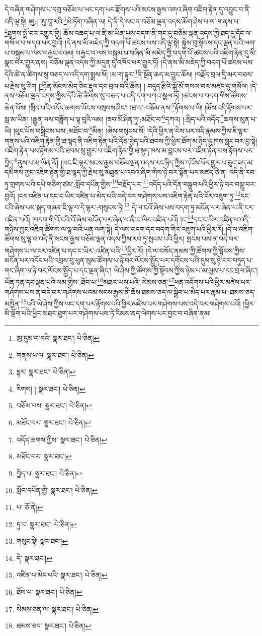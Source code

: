དེ་བཞིན་གཤེགས་པ་དགྲ་བཅོམ་པ་ཡང་དག་པར་རྫོགས་པའི་སངས་རྒྱས་འགའ་ཞིག་འཇིག་རྟེན་དུ་འབྱུང་བ་ནི་འདི་ལྟ་སྟེ། ཨུ:། ཨུ་བཱ་རའི་\footnote{ཨུ་དུམ་བ་རའི་  སྣར་ཐང་།  པེ་ཅིན། }མེ་ཏོག་བཞིན་ལ། དེ་ནི་དེ་སང་ན་བཅོམ་ལྡན་འདས་ཆོག་ཤེས་པ་ལ་:གནས་པ་\footnote{གནས་པ་ལ་  སྣར་ཐང་།  པེ་ཅིན། }ཐུགས་སྤྲོ་བར་འགྱུར་གྱི། ཆོས་འཆད་པ་ལ་ནི་མ་ཡིན་པས་བདག་ནི་གང་དུ་བཅོམ་ལྡན་འདས་ཀྱི་ཐད་དུ་དོང་ལ་གསོལ་བ་གདབ་པར་བྱའོ། །དེ་ནས་མི་མཇེད་ཀྱི་བདག་པོ་ཚངས་པས་འདི་ལྟ་སྟེ། སྐྱེས་བུ་སྟོབས་དང་ལྡན་པའི་ལག་པ་བསྐུམ་པ་ལས་བརྐྱང་བའམ། བརྐྱང་བ་ལས་བསྐུམ་པ་བཞིན་མི་མཇེད་ཀྱི་བདག་པོ་ཚངས་པའི་འཇིག་རྟེན་དུ་མི་སྣང་བར་གྱུར་ནས། བཅོམ་ལྡན་འདས་ཀྱི་མདུན་དུ་འཁོད་པར་གྱུར་ཏོ། །དེ་ནས་མི་མཇེད་ཀྱི་བདག་པོ་ཚངས་པས་དེའི་ཚེ་ན་ཚིགས་སུ་བཅད་པ་འདི་དག་སྨྲས་སོ། །མ་ག་དྷཱར་\footnote{དྷར་  སྣར་ཐང་།  པེ་ཅིན། }ནི་སྔོན་ཆད་མ་བྱུང་ཆོས། །བརྗོད་བྲལ་དྲི་མར་བཅས་པ་རྗེས་སུ་རིག །\footnote{རིགས། །  སྣར་ཐང་།  པེ་ཅིན། }ཉོན་མོངས་མེད་ཅིང་རྡུལ་དང་བྲལ་བའི་ཆོས། །
བདུད་རྩིའི་སྒོ་མོ་གསལ་བར་མཛད་དུ་གསོལ། །དེ་ནས་བཅོམ་ལྡན་འདས་ཀྱིས་དེའི་ཚེ་ཚིགས་སུ་བཅད་པ་འདི་དག་བཀའ་སྩལ་ཏོ། །ཚངས་པ་བདག་གིས་ཚོགས་ཆེན་པོས། །སྲིད་པའི་འདོད་ཆགས་ཡོངས་བསྲབས་ཤིང་། །ཐ་བ་:བཅོམ་ནས་\footnote{བཅོམ་པས་  སྣར་ཐང་།  པེ་ཅིན། }རྟོགས་པ་ཡི། །ཆོས་འདི་རྟོགས་པར་སླ་མ་ཡིན། །རྒྱུན་ལས་བཟློག་པ་ལྟ་བུའི་ལམ། །ཟབ་མོ་ཤིན་ཏུ་:མཐོང་བ་\footnote{མཐོང་བར་  སྣར་ཐང་།  པེ་ཅིན། }དཀའ། །:སྲིད་པའི་འདོད་\footnote{འདོད་ཆགས་ཀྱིས་  སྣར་ཐང་།  པེ་ཅིན། }ཆགས་མུན་པ་ཡི། །ཕུང་པོས་བསྒྲིབས་པས་:མཐོང་བ་\footnote{མཐོང་བར་  སྣར་ཐང་། }མིན། །ཞེས་གསུངས་སོ། །དེའི་ཕྱིར་ན་ངེས་པར་འདི་རྣམས་ཀྱིས་ཇི་ལྟར་གནས་པའི་འཇིག་རྟེན་གྱི་ཐ་སྙད་ནི་འཇིག་རྟེན་པའི་དོན་བྱེད་པའི་ཐབས་ཀྱི་ཕྱིར་ཐོག་མ་ཉིད་དུ་ཁས་བླང་བར་བྱ་སྟེ། འཇིག་རྟེན་པས་རྟོགས་པའི་ཐབས་སུ་གྱུར་པ་འཇིག་རྟེན་གྱི་ཐ་སྙད་ཁས་མ་བླངས་པར་འཇིག་རྟེན་པས་རྟོགས་པར་བྱེད་\footnote{བྱེད་པ་  སྣར་ཐང་།  པེ་ཅིན། }ནུས་པ་མ་ཡིན་ནོ། །ཡང་ཇི་ལྟར་སངས་རྒྱས་བཅོམ་ལྡན་འདས་རང་ཉིད་ཀྱིས་དངོས་པོར་གྱུར་པ་ཅུང་ཟད་མ་དམིགས་ཀྱང་འཇིག་རྟེན་གྱི་ཐ་སྙད་ཀྱི་རྗེས་སུ་མཐུན་པ་འབའ་ཞིག་གིས་ཉེ་བར་སྟོན་པར་མཛད་ཅེ་ན། འདི་ནི་རབ་ཏུ་གྲགས་པའི་དཔེ་གཅིག་ཙམ་:སློབ་དཔོན་གྱིས་\footnote{སློབ་དཔོན་གྱི་  སྣར་ཐང་།  པེ་ཅིན། }བརྗོད་པར་\footnote{པ་  ཅོ་ནེ། }འདོད་པའི་དོན་བསྒྲུབ་པའི་ཕྱིར་ཉེ་བར་བསྡུ་བར་བྱའོ། །ངར་འཛིན་པ་དང་ང་ཡིར་འཛིན་པ་མེད་པའི་བདེ་བར་གཤེགས་པས་འཇིག་རྟེན་པའི་ངོར་འཇུག་ཏུ་\footnote{ཏུ་ང་  སྣར་ཐང་།  པེ་ཅིན། }དང་ངའི་ཞེས་པས་སྐད་གཞན་ཇི་ལྟ་བ་དེ་ལྟར་:གསུངས་ཏེ།\footnote{གསུང་སྟེ།  སྣར་ཐང་། } དེ་ལ་ངའོ་ཞེས་པས་བདག་ཏུ་མངོན་པར་ཞེན་པ་ནི་ངར་འཛིན་པའོ། །བདག་གི་འོ་ངའི་འོ་ཞེས་མངོན་པར་ཞེན་པ་ནི་ང་ཡིར་འཛིན་པའོ། །ང་\footnote{དེ་  སྣར་ཐང་། }དང་ང་ཡིར་འཛིན་པ་འདི་གཉིས་ཀྱང་འཇིག་ཚོགས་ལ་ལྟ་བའི་ཡན་ལག་སྟེ། དེ་ལས་བདག་དང་བདག་གིར་འཇུག་པའི་ཕྱིར་རོ། །དེ་ལ་འཇིག་ཚོགས་སུ་ལྟ་བ་འདི་ནི་སངས་རྒྱས་བཅོམ་ལྡན་འདས་ཀྱིས་རབ་ཏུ་སྤངས་པའི་ཕྱིར། སྤངས་པས་ན་བདེ་བར་གཤེགས་པ་ལ་ངར་འཛིན་པ་དང་ང་ཡིར་:འཛིན་པའི་\footnote{འཛིན་པ་མེད་པའི་  སྣར་ཐང་།  པེ་ཅིན། }ཕྱིར་རོ། །དེ་ལ་བསོད་ནམས་ཀྱི་ཚོགས་ཀྱི་སྟོབས་ཀྱིས་མངོན་པར་འདོད་པའི་འབྲས་བུ་ཕུན་སུམ་ཚོགས་པ་ཉེ་བར་ལོངས་སྤྱོད་པར་དགོངས་པའི་དུས་སུ་ཉེ་བར་བཏུད་པ་གང་ཞིག་ལ་ཉེ་བར་ལོངས་སྤྱོད་པ་དང་ལྡན་ཞིང་། ཡེ་ཤེས་ཀྱི་ཚོགས་ཀྱི་སྟོབས་ཀྱིས་ཉེས་པ་མ་ལུས་པ་དང་བྲལ་ཞིང་། ཡོན་ཏན་དང་ལྡན་པའི་ལམ་གྱིས་:ཐོབ་པ་\footnote{ཐོས་པ་  སྣར་ཐང་།  པེ་ཅིན། }མཐའ་ཡས་པའི་:སེམས་ཅན་\footnote{སེམས་ཅན་ལ་  སྣར་ཐང་།  པེ་ཅིན། }ཕན་འདོགས་པའི་ཕྱིར་མཛེས་པར་གཤེགས་པས་ན་བདེ་བར་གཤེགས་པའམ་སངས་རྒྱས་ནི་ཆོས་ཐམས་ཅད་ལ་སྒྲིབ་པ་མེད་པར་རྣམ་པ་:ཐམས་ཅད་མཁྱེན་\footnote{ཐམས་ཅད་  སྣར་ཐང་།  པེ་ཅིན། }པའི་ཡེ་ཤེས་ཀྱིས་ཡང་དག་པར་རྟོགས་པའི་ཕྱིར་མཛེས་པར་གཤེགས་པས་བདེ་བར་གཤེགས་པའོ། །ཕྱིར་མི་ལྡོག་པའི་ཕྱིར་མཐར་ཐུག་པར་གཤེགས་པས་ཏེ་རིམས་ནད་ལེགས་པར་བྱང་བ་བཞིན་ནམ། 